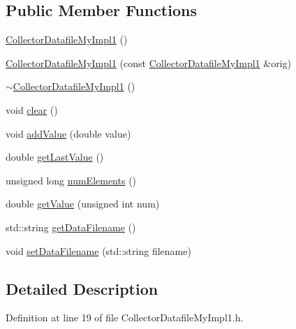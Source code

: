 \subsection*{Public Member Functions}
\begin{DoxyCompactItemize}
\item 
\hyperlink{class_collector_datafile_my_impl1_a88bec096f9b7d707bf436df5b2ab34e1}{Collector\-Datafile\-My\-Impl1} ()
\item 
\hyperlink{class_collector_datafile_my_impl1_a93b68a7b411573a7ff133856f22cbb1f}{Collector\-Datafile\-My\-Impl1} (const \hyperlink{class_collector_datafile_my_impl1}{Collector\-Datafile\-My\-Impl1} \&orig)
\item 
\hyperlink{class_collector_datafile_my_impl1_ac7362a33ec9e82bd3298068cc0c1c6f0}{$\sim$\-Collector\-Datafile\-My\-Impl1} ()
\item 
void \hyperlink{class_collector_datafile_my_impl1_a594004f005db5dd1122946445f4db70d}{clear} ()
\item 
void \hyperlink{class_collector_datafile_my_impl1_aa909fc87f2ee082512616840c9031365}{add\-Value} (double value)
\item 
double \hyperlink{class_collector_datafile_my_impl1_a5a29b2f71a4630c658fb83c047fb1054}{get\-Last\-Value} ()
\item 
unsigned long \hyperlink{class_collector_datafile_my_impl1_ac8ad59a3b664d082c8ca4fca9887148a}{num\-Elements} ()
\item 
double \hyperlink{class_collector_datafile_my_impl1_a55a505d56f9b95a55473bdf1ab24cffe}{get\-Value} (unsigned int num)
\item 
std\-::string \hyperlink{class_collector_datafile_my_impl1_a5ebe8076b9eb9816a1b7d823943102cf}{get\-Data\-Filename} ()
\item 
void \hyperlink{class_collector_datafile_my_impl1_ac4c401ae3cf4ccc723b6b9efa614ccd1}{set\-Data\-Filename} (std\-::string filename)
\end{DoxyCompactItemize}


\subsection{Detailed Description}


Definition at line 19 of file Collector\-Datafile\-My\-Impl1.\-h.



